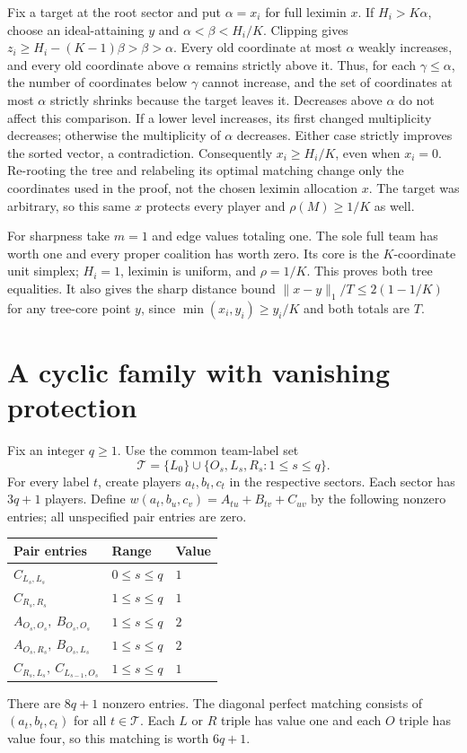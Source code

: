 \documentclass[11pt]{article}
\theoremstyle{remark}\newtheorem{remark}[theorem]{Remark}
\begin{document}
Fix a target at the root sector and put $\alpha=x_i$ for full leximin $x$.
If $H_i>K\alpha$, choose an ideal-attaining $y$ and
$\alpha<\beta<H_i/K$. Clipping gives
$z_i\ge H_i-(K-1)\beta>\beta>\alpha$.
Every old coordinate at most $\alpha$ weakly increases, and every old
coordinate above $\alpha$ remains strictly above it. Thus, for each
$\gamma\le\alpha$, the number of coordinates below $\gamma$ cannot
increase, and the set of coordinates at most $\alpha$ strictly shrinks
because the target leaves it. Decreases above $\alpha$ do not affect this
comparison. If a lower level
increases, its first changed multiplicity decreases; otherwise the
multiplicity of $\alpha$ decreases. Either case strictly improves the sorted
vector, a contradiction. Consequently $x_i\ge H_i/K$, even when $x_i=0$.
Re-rooting the tree and relabeling its optimal matching change only the
coordinates used in the proof, not the chosen leximin allocation $x$.
The target was arbitrary, so this same $x$ protects every player and
$\rho(M)\ge1/K$ as well.

For sharpness take $m=1$ and edge values totaling one. The sole full team
has worth one and every proper coalition has worth zero. Its core is the
$K$-coordinate unit simplex; $H_i=1$, leximin is uniform, and
$\rho=1/K$. This proves both tree equalities. It also gives the sharp distance
bound $\|x-y\|_1/T\le2(1-1/K)$ for any tree-core point $y$, since
$\min(x_i,y_i)\ge y_i/K$ and both totals are $T$.
\section{A cyclic family with vanishing protection}
Fix an integer $q\geq1$. Use the common team-label set
\[
           \mathcal T=\{L_0\}\cup\{O_s,L_s,R_s:1\leq s\leq q\}.
\]
For every label $t$, create players $a_t,b_t,c_t$ in the respective
sectors. Each sector has $3q+1$ players. Define
$w(a_t,b_u,c_v)=A_{tu}+B_{tv}+C_{uv}$ by the following nonzero entries;
all unspecified pair entries are zero.
\begin{center}
\begin{tabular}{lll}\toprule
Pair entries & Range & Value\\\midrule
$C_{L_s,L_s}$ & $0\leq s\leq q$ & $1$\\
$C_{R_s,R_s}$ & $1\leq s\leq q$ & $1$\\
$A_{O_s,O_s},\ B_{O_s,O_s}$ & $1\leq s\leq q$ & $2$\\
$A_{O_s,R_s},\ B_{O_s,L_s}$ & $1\leq s\leq q$ & $2$\\
$C_{R_s,L_s},\ C_{L_{s-1},O_s}$ & $1\leq s\leq q$ & $1$\\\bottomrule
\end{tabular}
\end{center}
There are $8q+1$ nonzero entries. The diagonal perfect matching consists
of $(a_t,b_t,c_t)$ for all $t\in\mathcal T$. Each $L$ or $R$ triple has
value one and each $O$ triple has value four, so this matching is worth
$6q+1$.
\end{document}
